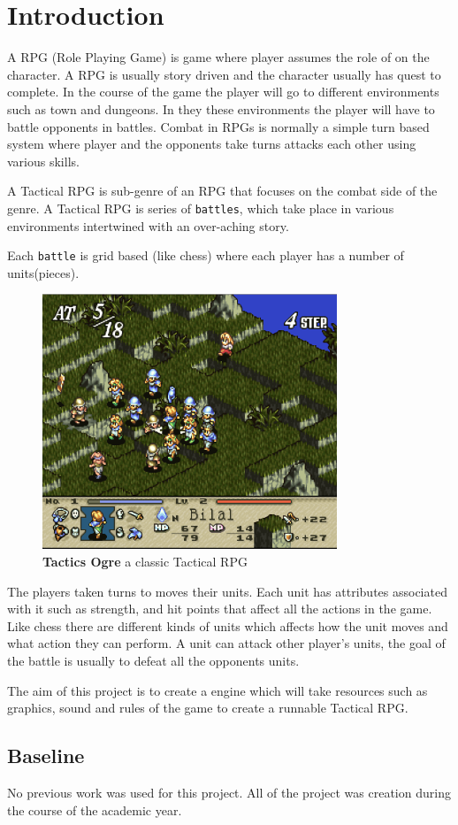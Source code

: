 \section{Introduction} 
\label{introduction}
       
A RPG (Role Playing Game) is game where player assumes the role of on the character. A RPG is usually story driven and the character usually has quest to complete. In the course of the game the player will go to different environments such as town and dungeons. In they these environments the player will have to battle opponents in battles. Combat in RPGs is normally a simple turn based system where player and the opponents take turns attacks each other using various skills. 

A Tactical RPG is sub-genre of an RPG that focuses on the combat side of the genre. A Tactical RPG is series of \texttt{battles}, which take place in various environments intertwined with an over-aching story.

Each \texttt{battle} is grid based (like chess) where each player has a number of units(pieces). 
\begin{figure}
	[htbp] \centering 
	\includegraphics[height=3in]{figures/TRPG.png} \caption{\textbf{Tactics Ogre}\cite{to} a classic Tactical RPG } \label{fig:figures_TRPG} 
\end{figure}
The players taken turns to moves their units. Each unit has attributes associated with it such as strength, and hit points that affect all the actions in the game. Like chess there are different kinds of units which affects how the unit moves and what action they can perform. A unit can attack other player's units, the goal of the battle is usually to defeat all the opponents units.

The aim of this project is to create a engine which will take resources such as graphics, sound and rules of the game to create a runnable Tactical RPG.

\subsection{Baseline} %
\label{sub:baseline}

No previous work was used for this project. All of the project was creation during the course of the academic year.


